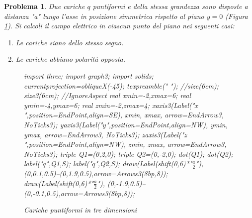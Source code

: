 \documentclass[a4paper,oneside]{article}
\newtheorem{problema}{Problema}
\let\oldhat\hat
\renewcommand{\vec}[1]{\mathbf{#1}}
\renewcommand{\hat}[1]{\widehat{\mathbf{#1}}}
\begin{document}
\begin{problema}
	Due cariche $q$ puntiformi e della stessa grandezza
	sono disposte a distanza "a" lungo l'asse in
	posizione simmetrica rispetto al piano $y = 0$
	(Figura \ref{fig:dipolo_3d}).
	Si calcoli il campo elettrico in ciascun punto del
	piano nei seguenti casi:
	\begin{enumerate}%
		\item Le cariche siano dello stesso segno.
		\item Le cariche abbiano polarità opposta.
	\end{enumerate}
	\begin{figure}[H]
			\centering
			\begin{asy}[height=6cm,inline=true,attach=false,viewportwidth=\linewidth]
				import three;
				import graph3;
				import solids;
				currentprojection=obliqueX(-45);
				texpreamble("\let\oldhat\hat
				\renewcommand{\vec}[1]{\mathbf{#1}}
				\renewcommand{\hat}[1]{\oldhat{\mathbf{#1}}}");
				//size(6cm);
				size3(6cm);		//IgnoreAspect
				real xmin=-2,xmax=6;
				real ymin=-4,ymax=6;
				real zmin=-2,zmax=4;
				xaxis3(Label("\small $x$",position=EndPoint,align=SE),
				xmin, xmax, arrow=EndArrow3, NoTicks3);
				yaxis3(Label("\small $y$",position=EndPoint,align=NW),
				ymin, ymax, arrow=EndArrow3, NoTicks3);
				zaxis3(Label("\small $z$",position=EndPoint,align=NW),
				zmin, zmax, arrow=EndArrow3, NoTicks3);
				triple Q1=(0,2,0);
				triple Q2=(0,-2,0);			
				dot(Q1);
				dot(Q2);
				label("\small $q$",Q1,S);
				label("\small $q$",Q2,S);
				draw(Label(shift(0,6)*"\small $\frac{a}{2}$"),
				(0,0.1,0.5)--(0,1.9,0.5),arrow=Arrows3(8bp,8));
				draw(Label(shift(0,6)*"\small $\frac{a}{2}$"),
				(0,-1.9,0.5)--(0,-0.1,0.5),arrow=Arrows3(8bp,8));
			\end{asy}
			\caption{Cariche puntiformi in tre dimensioni}
			\label{fig:dipolo_3d}
		\end{figure}
\end{problema}
\end{document}
